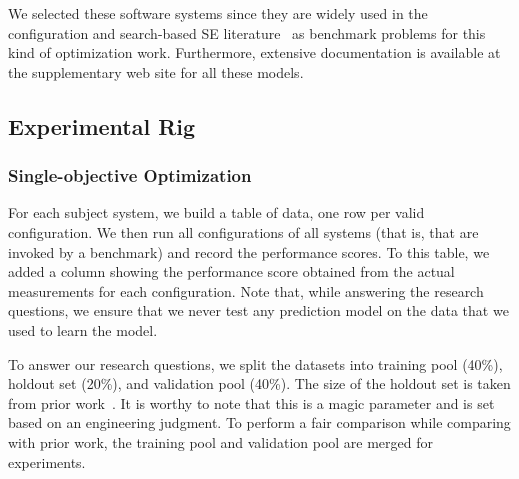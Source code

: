 We selected these software systems since they are widely used in the configuration and search-based SE
literature~\cite{siegmund2012predicting, guo2013variability, sarkar2015cost, nair17, nair2017using, oh2017finding, jamshidi2016uncertainty, zuluaga2016varepsilon} as benchmark problems for this kind of optimization work. Furthermore, extensive documentation
is available at the supplementary web site for all these models.

\subsection{Experimental Rig}
\subsubsection{Single-objective Optimization}
For each subject system, we build a table of data, one row per valid configuration. We then run all configurations of all systems (that is, that are invoked by a benchmark) and record the performance scores. To this table, we added a column showing the performance score obtained from the actual measurements for each configuration. Note that, while answering the research questions, we ensure that we never test any prediction model on the data that we used to learn the model. 

To answer our research questions, we split the datasets into training pool (40\%), holdout set (20\%), and validation pool (40\%). The size of the holdout set is taken from prior work~\cite{nair2017using}. It is worthy to note that this is a magic parameter and is set based on an engineering judgment. To perform a fair comparison while comparing \flash with prior work, the training pool and validation pool are merged for \flash experiments.


